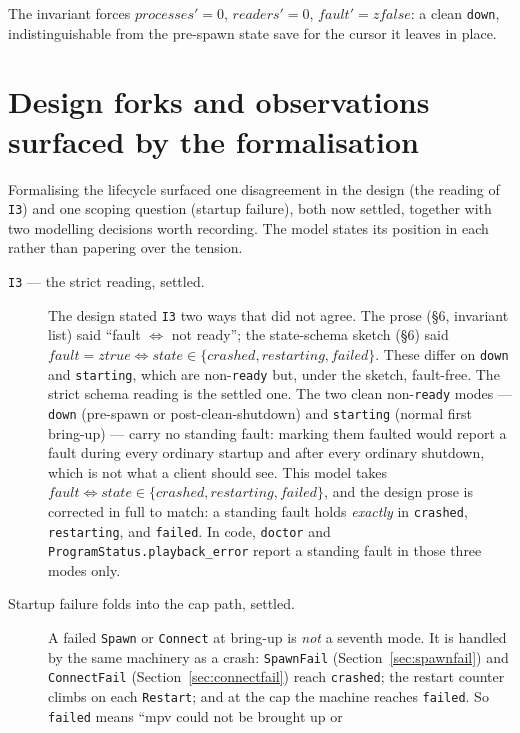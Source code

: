 \documentclass[a4paper,10pt,fleqn]{article}
\begin{document}
The invariant forces $processes' = 0$, $readers' = 0$, $fault' = zfalse$: a
clean \texttt{down}, indistinguishable from the pre-spawn state save for the
cursor it leaves in place.

\section{Design forks and observations surfaced by the formalisation}
\label{sec:forks}

Formalising the lifecycle surfaced one disagreement in the design (the reading
of \texttt{I3}) and one scoping question (startup failure), both now settled,
together with two modelling decisions worth recording. The model states its
position in each rather than papering over the tension.

\begin{description}
  \item[\texttt{I3} --- the strict reading, settled.] The design stated
    \texttt{I3} two ways that did not agree. The prose (\S6, invariant list)
    said ``fault $\iff$ not ready''; the state-schema sketch (\S6) said $fault =
    ztrue \iff state \in \{ crashed, restarting, failed \}$. These differ on
    \texttt{down} and \texttt{starting}, which are non-\texttt{ready} but, under
    the sketch, fault-free. The strict schema reading is the settled one. The
    two clean non-\texttt{ready} modes --- \texttt{down} (pre-spawn or
    post-clean-shutdown) and \texttt{starting} (normal first bring-up) --- carry
    no standing fault: marking them faulted would report a fault during every
    ordinary startup and after every ordinary shutdown, which is not what a
    client should see. This model takes $fault \iff state \in \{ crashed,
    restarting, failed \}$, and the design prose is corrected in full to match:
    a standing fault holds \emph{exactly} in \texttt{crashed}, \texttt{restarting},
    and \texttt{failed}. In code, \texttt{doctor} and
    \texttt{ProgramStatus.playback\_error} report a standing fault in those three
    modes only.
  \item[Startup failure folds into the cap path, settled.] A failed
    \texttt{Spawn} or \texttt{Connect} at bring-up is \emph{not} a seventh mode.
    It is handled by the same machinery as a crash: \texttt{SpawnFail}
    (Section~\ref{sec:spawnfail}) and \texttt{ConnectFail}
    (Section~\ref{sec:connectfail}) reach \texttt{crashed}; the restart counter
    climbs on each \texttt{Restart}; and at the cap the machine reaches
    \texttt{failed}. So \texttt{failed} means ``mpv could not be brought up or

\end{description}
\end{document}
